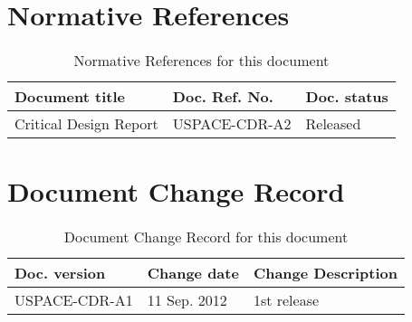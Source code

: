 \thispagestyle{plain}
\chapter*{Normative References}
%
\begin{table}[H]
\centering
\caption{Normative References for this document}
\label{tab:normative_references}
\begin{tabular}{lll}
\hline
\textbf{Document title} & \textbf{Doc. Ref. No.} & \textbf{Doc. status}\\
\hline
Critical Design Report & USPACE-CDR-A2 & Released\\
\hline
\end{tabular}
\end{table}
%
\newpage
%
\thispagestyle{plain}
\chapter*{Document Change Record}
%
%
\begin{table}[H]
\centering
\caption{Document Change Record for this document}
\label{tab:document_change_record}
\begin{tabular}{p{}p{}p{}}
\hline
\textbf{Doc. version} & \textbf{Change date} & \textbf{Change Description}\\
\hline
USPACE-CDR-A1 & 11 Sep. 2012 & 1st release\\
\hline
\end{tabular}
\end{table}